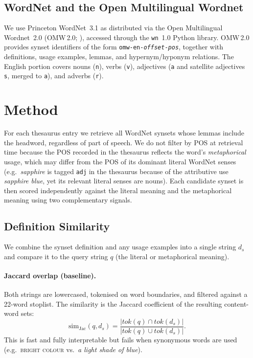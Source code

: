 \documentclass[11pt,a4paper]{article}
\begin{document}
\subsection{WordNet and the Open Multilingual Wordnet}

We use Princeton WordNet~3.1 as distributed via the Open Multilingual
Wordnet~2.0 (OMW\,2.0; \citealt{bond-foster-2013-linking}), accessed
through the \texttt{wn}~1.0 Python library.
OMW\,2.0 provides synset identifiers of the form
\texttt{omw-en-\textit{offset}-\textit{pos}}, together with definitions,
usage examples, lemmas, and hypernym/hyponym relations.
The English portion covers nouns (\texttt{n}), verbs (\texttt{v}),
adjectives (\texttt{a} and satellite adjectives \texttt{s}, merged to \texttt{a}), and adverbs (\texttt{r}).

\section{Method}
\label{sec:method}

For each thesaurus entry we retrieve all WordNet synsets whose lemmas
include the headword, regardless of part of speech.
We do not filter by POS at retrieval time because the POS recorded in the
thesaurus reflects the word's \emph{metaphorical} usage, which may differ
from the POS of its dominant literal WordNet senses (e.g.\ \emph{sapphire}
is tagged \texttt{adj} in the thesaurus because of the attributive use
\emph{sapphire blue}, yet its relevant literal senses are nouns).
Each candidate synset is then scored independently against the literal
meaning and the metaphorical meaning using two complementary signals.

\subsection{Definition Similarity}
\label{subsec:defsim}

We combine the synset definition and any usage examples into a single
string $d_s$ and compare it to the query string $q$ (the literal or
metaphorical meaning).

\paragraph{Jaccard overlap (baseline).}
Both strings are lowercased, tokenised on word boundaries, and filtered
against a 22-word stoplist.
The similarity is the Jaccard coefficient of the resulting content-word sets:
\begin{equation}
  \mathrm{sim}_{\mathrm{Jac}}(q, d_s)
    = \frac{|\mathit{tok}(q) \cap \mathit{tok}(d_s)|}
           {|\mathit{tok}(q) \cup \mathit{tok}(d_s)|}.
\end{equation}
This is fast and fully interpretable but fails when synonymous words are
used (e.g.\ \textsc{bright colour} vs.\ \emph{a light shade of blue}).
\end{document}
